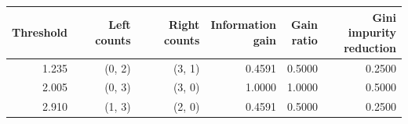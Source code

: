 \begin{tabular}{@{}rrrrrr@{}}
\toprule
Threshold & Left counts & Right counts & \shortstack{Information\\gain} & \shortstack{Gain\\ratio} & \shortstack{Gini impurity\\reduction} \\
\midrule
1.235 & (0, 2) & (3, 1) & 0.4591 & 0.5000 & 0.2500 \\
2.005 & (0, 3) & (3, 0) & 1.0000 & 1.0000 & 0.5000 \\
2.910 & (1, 3) & (2, 0) & 0.4591 & 0.5000 & 0.2500 \\
\bottomrule
\end{tabular}
